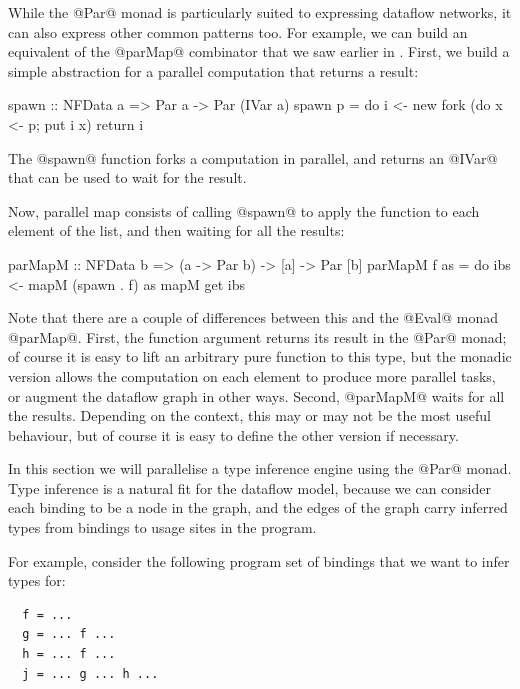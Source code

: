 While the @Par@ monad is particularly suited to expressing dataflow
networks, it can also express other common patterns too.  For example,
we can build an equivalent of the @parMap@ combinator that we saw
earlier in .  First, we build a simple abstraction
for a parallel computation that returns a result:

\begin{haskell}
spawn :: NFData a => Par a -> Par (IVar a)
spawn p = do
  i <- new
  fork (do x <- p; put i x)
  return i
\end{haskell}

\noindent The @spawn@ function forks a computation in parallel, and
returns an @IVar@ that can be used to wait for the result.

Now, parallel map consists of calling @spawn@ to apply the function to
each element of the list, and then waiting for all the results:

\begin{haskell}
parMapM :: NFData b => (a -> Par b) -> [a] -> Par [b]
parMapM f as = do
  ibs <- mapM (spawn . f) as
  mapM get ibs
\end{haskell}

\noindent Note that there are a couple of differences between this and
the @Eval@ monad @parMap@.  First, the function argument returns its
result in the @Par@ monad; of course it is easy to lift an arbitrary
pure function to this type, but the monadic version allows the
computation on each element to produce more parallel tasks, or augment
the dataflow graph in other ways.  Second, @parMapM@ waits for all the
results.  Depending on the context, this may or may not be the most
useful behaviour, but of course it is easy to define the other version
if necessary.


In this section we will parallelise a type inference engine using the
@Par@ monad.  Type inference is a natural fit for the dataflow model,
because we can consider each binding to be a node in the graph, and
the edges of the graph carry inferred types from bindings to usage
sites in the program.

For example, consider the following program set of bindings that we
want to infer types for:

{\small \begin{verbatim}
  f = ...
  g = ... f ...
  h = ... f ...
  j = ... g ... h ...
\end{verbatim}}

